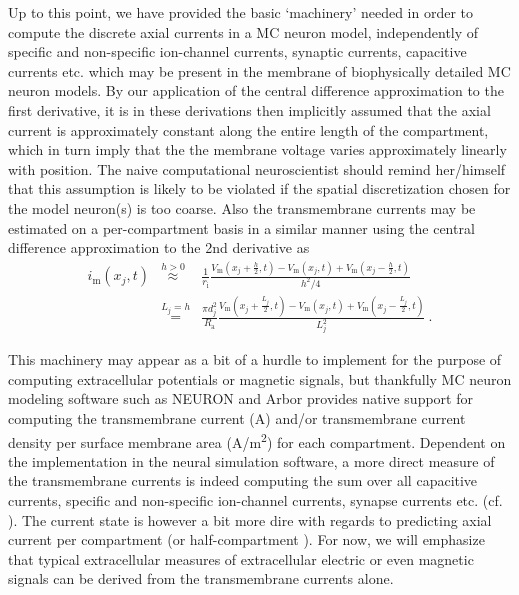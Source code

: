 Up to this point, we have provided the basic `machinery' needed in order to compute the discrete axial currents in a MC neuron model,
independently of specific and non-specific ion-channel currents, synaptic currents, capacitive currents etc. which may be present in the membrane of biophysically detailed MC neuron models.
By our application of the central difference approximation to the first derivative,
it is in these derivations then implicitly assumed that the axial current is approximately constant along the entire length of the compartment,
which in turn imply that the the membrane voltage varies approximately linearly with position.
The naive computational neuroscientist should remind her/himself that this assumption is likely to be violated if the spatial discretization chosen for the model neuron(s) is too coarse.
%
Also the transmembrane currents may be estimated on a per-compartment basis in a similar manner using the central difference approximation to the 2nd derivative as
%
\begin{eqnarray}
i_\mathrm{m}(x_j, t) &\overset{h>0}{\approx}& \frac{1}{r_\mathrm{i}} \frac{V_\mathrm{m}(x_j + \frac{h}{2}, t) - V_\mathrm{m}(x_j, t)+ V_\mathrm{m}(x_j - \frac{h}{2}, t)}{h^2 / 4} \nonumber \\
		&\overset{L_j=h}{=}& \frac{\pi d_j^2}{R_\mathrm{a}} \frac{V_\mathrm{m}(x_j + \frac{L_j}{2}, t) - V_\mathrm{m}(x_j, t) + V_\mathrm{m}(x_j - \frac{L_j}{2}, t)}{L_j^2} ~.
\label{eq:LFPy_im_discrete}
\end{eqnarray}


This machinery may appear as a bit of a hurdle to implement for the purpose of computing extracellular potentials or magnetic signals,
but thankfully MC neuron modeling software such as NEURON and Arbor provides native support for computing the transmembrane current (\si{\ampere}) and/or transmembrane current density per surface membrane area (\si{\ampere/\metre^2}) for each compartment.
Dependent on the implementation in the neural simulation software,
a more direct measure of the transmembrane currents is indeed computing the sum over all capacitive currents, specific and non-specific ion-channel currents, synapse currents etc. (cf. ).
%
The current state is however a bit more dire with regards to predicting axial current per compartment (or half-compartment \cite{Hagen2018}).
For now, we will emphasize that typical extracellular measures of extracellular electric or even magnetic signals can be derived from the transmembrane currents alone.

